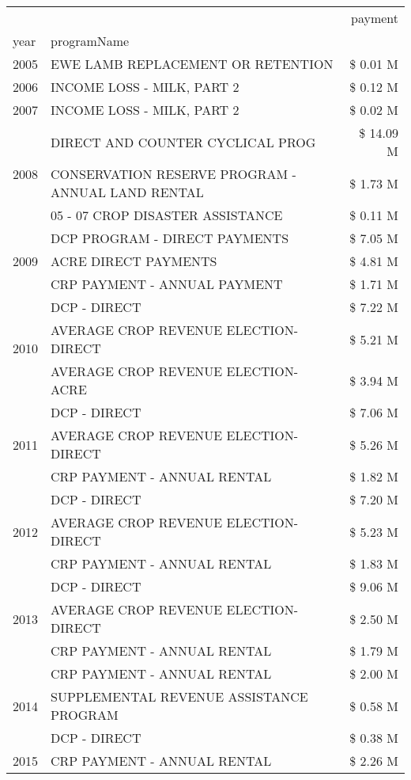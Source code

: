 \begin{tabular}{llr}
\toprule
 &  & payment \\
year & programName &  \\
\midrule
2005 & EWE LAMB REPLACEMENT OR RETENTION & \$ 0.01 M \\
\cline{1-3}
2006 & INCOME LOSS - MILK, PART 2 & \$ 0.12 M \\
\cline{1-3}
2007 & INCOME LOSS - MILK, PART 2 & \$ 0.02 M \\
\cline{1-3}
\multirow[t]{3}{*}{2008} & DIRECT AND COUNTER CYCLICAL PROG & \$ 14.09 M \\
 & CONSERVATION RESERVE PROGRAM - ANNUAL LAND RENTAL & \$ 1.73 M \\
 & 05 - 07 CROP DISASTER ASSISTANCE & \$ 0.11 M \\
\cline{1-3}
\multirow[t]{3}{*}{2009} & DCP PROGRAM - DIRECT PAYMENTS & \$ 7.05 M \\
 & ACRE DIRECT PAYMENTS & \$ 4.81 M \\
 & CRP PAYMENT - ANNUAL PAYMENT & \$ 1.71 M \\
\cline{1-3}
\multirow[t]{3}{*}{2010} & DCP - DIRECT & \$ 7.22 M \\
 & AVERAGE CROP REVENUE ELECTION-DIRECT & \$ 5.21 M \\
 & AVERAGE CROP REVENUE ELECTION-ACRE & \$ 3.94 M \\
\cline{1-3}
\multirow[t]{3}{*}{2011} & DCP - DIRECT & \$ 7.06 M \\
 & AVERAGE CROP REVENUE ELECTION-DIRECT & \$ 5.26 M \\
 & CRP PAYMENT - ANNUAL RENTAL & \$ 1.82 M \\
\cline{1-3}
\multirow[t]{3}{*}{2012} & DCP - DIRECT & \$ 7.20 M \\
 & AVERAGE CROP REVENUE ELECTION-DIRECT & \$ 5.23 M \\
 & CRP PAYMENT - ANNUAL RENTAL & \$ 1.83 M \\
\cline{1-3}
\multirow[t]{3}{*}{2013} & DCP - DIRECT & \$ 9.06 M \\
 & AVERAGE CROP REVENUE ELECTION-DIRECT & \$ 2.50 M \\
 & CRP PAYMENT - ANNUAL RENTAL & \$ 1.79 M \\
\cline{1-3}
\multirow[t]{3}{*}{2014} & CRP PAYMENT - ANNUAL RENTAL & \$ 2.00 M \\
 & SUPPLEMENTAL REVENUE ASSISTANCE PROGRAM & \$ 0.58 M \\
 & DCP - DIRECT & \$ 0.38 M \\
\cline{1-3}
\multirow[t]{3}{*}{2015} & CRP PAYMENT - ANNUAL RENTAL & \$ 2.26 M \\

\end{tabular}
